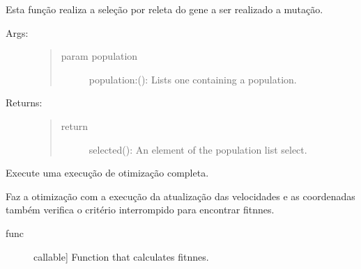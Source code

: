 \documentclass[letterpaper,10pt,english]{sphinxmanual}
\begin{document}
\begin{fulllineitems}
\begin{fulllineitems}
\begin{description}
\end{description}

\end{fulllineitems}


\begin{fulllineitems}
\label{\detokenize{index:ga.Genetic.roulette_selection}}
Esta função realiza a seleção por releta do gene a ser realizado a mutação.
\begin{description}
\item[{Args:}] \leavevmode\begin{quote}\begin{description}
\item[{param population}] \leavevmode
population:(): Lists one containing a population.

\end{description}\end{quote}

\item[{Returns:}] \leavevmode\begin{quote}\begin{description}
\item[{return}] \leavevmode
selected(): An element of the population list select.

\end{description}\end{quote}

\end{description}

\end{fulllineitems}


\begin{fulllineitems}
\label{\detokenize{index:ga.Genetic.run}}
Execute uma execução de otimização completa.

Faz a otimização com a execução da atualização das velocidades
e as coordenadas também verifica o critério interrompido para encontrar fitnnes.
\begin{description}
\item[{func}] \leavevmode{[}callable{]}
Function that calculates fitnnes.


\end{description}
\end{fulllineitems}
\end{fulllineitems}
\end{document}
